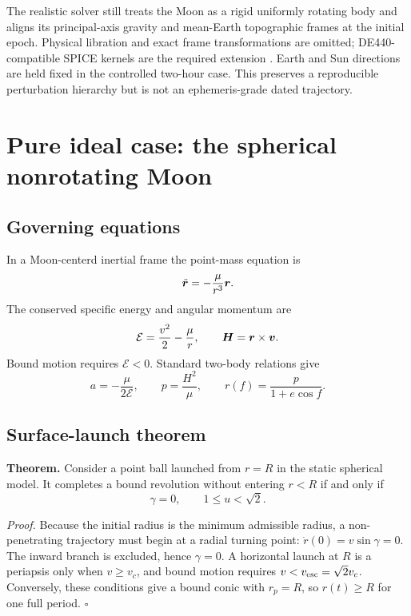 The realistic solver still treats the Moon as a rigid uniformly rotating body and aligns its principal-axis gravity and mean-Earth topographic frames at the initial epoch. Physical libration and exact frame transformations are omitted; DE440-compatible SPICE kernels are the required extension \cite{Acton1996,NAIFLunarFrames}. Earth and Sun directions are held fixed in the controlled two-hour case. This preserves a reproducible perturbation hierarchy but is not an ephemeris-grade dated trajectory.

\section{Pure ideal case: the spherical nonrotating Moon}

\subsection{Governing equations}

In a Moon-centerd inertial frame the point-mass equation is
\begin{equation}
 \ddot{\bm{r}}=-\frac{\mu}{r^3}\bm{r}.
\label{eq:twobody}
\end{equation}
The conserved specific energy and angular momentum are
\begin{equation}
 \mathcal E=\frac{v^2}{2}-\frac{\mu}{r},\qquad
 \bm{H}=\bm{r}\times\bm{v}.
\label{eq:invariants}
\end{equation}
Bound motion requires $\mathcal E<0$. Standard two-body relations give \cite{Bate1971,Curtis2020,Vallado2013}
\begin{equation}
 a=-\frac{\mu}{2\mathcal E},\qquad
 p=\frac{H^2}{\mu},\qquad
 r(f)=\frac{p}{1+e\cos f}.
\label{eq:conic}
\end{equation}

\subsection{Surface-launch theorem}

\textbf{Theorem.} Consider a point ball launched from \(r=R\) in the static spherical model. It completes a bound revolution without entering \(r<R\) if and only if
\begin{equation}
 \boxed{\gamma=0,\qquad 1\leq u<\sqrt{2}.}
\label{eq:surface_theorem}
\end{equation}

\emph{Proof.} Because the initial radius is the minimum admissible radius, a non-penetrating trajectory must begin at a radial turning point: \(\dot r(0)=v\sin\gamma=0\). The inward branch is excluded, hence \(\gamma=0\). A horizontal launch at \(R\) is a periapsis only when \(v\geq v_c\), and bound motion requires \(v<v_{\rm esc}=\sqrt2v_c\). Conversely, these conditions give a bound conic with \(r_p=R\), so \(r(t)\geq R\) for one full period. \hfill$\square$

